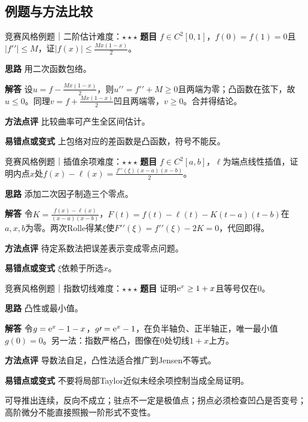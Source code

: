\subsection{例题与方法比较}
\begin{example}{竞赛风格例题｜二阶估计}{难度：$\star\star\star$}
\label{ex:2:13}\textbf{题目} $f\in C^2[0,1]$，$f(0)=f(1)=0$且$|f\prime\prime|\le M$，证$|f(x)|\le \frac{Mx(1-x)}{2}$。\par
\textbf{思路} 用二次函数包络。\par
\textbf{解答} 设$u=f-\frac{Mx(1-x)}{2}$，则$u\prime\prime=f\prime\prime+M\ge0$且两端为零；凸函数在弦下，故$u\le0$。同理$v=f+\frac{Mx(1-x)}{2}$凹且两端零，$v\ge0$。合并得结论。\par
\textbf{方法点评} 比较曲率可产生全区间估计。\par
\textbf{易错点或变式} 上包络对应的差函数是凸函数，符号不能反。
\end{example}
\begin{example}{竞赛风格例题｜插值余项}{难度：$\star\star\star$}
\label{ex:2:14}\textbf{题目} $f\in C^2[a,b]$，$\ell$为端点线性插值，证明内点$x$处$f(x)-\ell(x)=\frac{f\prime\prime(\xi)(x-a)(x-b)}{2}$。\par
\textbf{思路} 添加二次因子制造三个零点。\par
\textbf{解答} 令$K=\frac{f(x)-\ell(x)}{(x-a)(x-b)}$，$F(t)=f(t)-\ell(t)-K(t-a)(t-b)$在$a,x,b$为零。两次Rolle得某$\xi$使$F\prime\prime(\xi)=f\prime\prime(\xi)-2K=0$，代回即得。\par
\textbf{方法点评} 待定系数法把误差表示变成零点问题。\par
\textbf{易错点或变式} $\xi$依赖于所选$x$。
\end{example}
\begin{example}{竞赛风格例题｜指数切线}{难度：$\star\star\star$}
\label{ex:2:15}\textbf{题目} 证明$\mathrm{e}^x\ge1+x$且等号仅在0。\par
\textbf{思路} 凸性或最小值。\par
\textbf{解答} 令$g=\mathrm{e}^x-1-x$，$g\prime=\mathrm{e}^x-1$，在负半轴负、正半轴正，唯一最小值$g(0)=0$。另一法：指数严格凸，图像在0处切线$1+x$上方。\par
\textbf{方法点评} 导数法自足，凸性法适合推广到Jensen不等式。\par
\textbf{易错点或变式} 不要将局部Taylor近似未经余项控制当成全局证明。
\end{example}
\begin{warning}可导推出连续，反向不成立；驻点不一定是极值点；拐点必须检查凹凸是否变号；高阶微分不能直接照搬一阶形式不变性。\end{warning}


